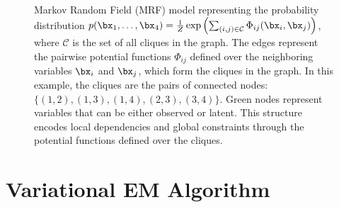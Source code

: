 \documentclass{lecture}
\begin{document}
\begin{figure}[ht]
	\centering
	\caption{Markov Random Field (MRF) model representing the probability distribution $p(\bx_1,\ldots,\bx_4)= \frac{1}{Z}\exp\left(\sum_{(i,j)\in\mathcal{C}} \Phi_{ij}(\bx_i,\bx_j)\right)$, where $\mathcal{C}$ is the set of all cliques in the graph. The edges represent the pairwise potential functions $\Phi_{ij}$ defined over the neighboring variables $\bx_i$ and $\bx_j$, which form the cliques in the graph. In this example, the cliques are the pairs of connected nodes: $\{(1,2), (1,3), (1,4), (2,3), (3,4)\}$. Green nodes represent variables that can be either observed or latent. This structure encodes local dependencies and global constraints through the potential functions defined over the cliques.}
	\label{fig:mrf}
\end{figure}

\section{Variational EM Algorithm}
\end{document}
